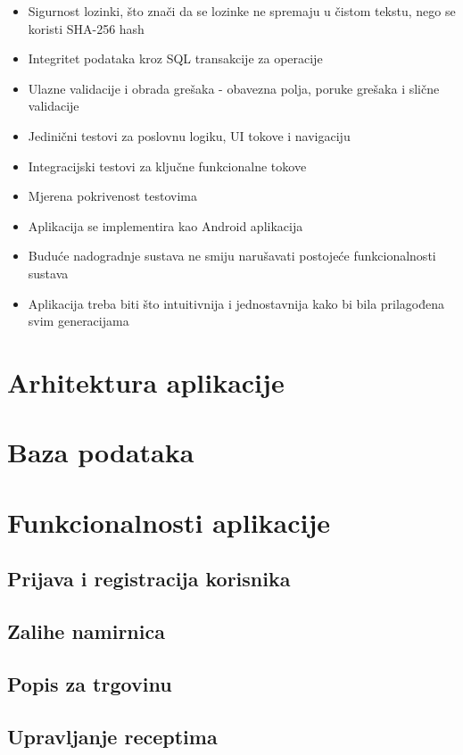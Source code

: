 \documentclass[diplomskirad]{fer}
\begin{document}
\begin{itemize}
    \item Sigurnost lozinki, što znači da se lozinke ne spremaju u čistom tekstu, nego se koristi SHA-256 hash
    \item Integritet podataka kroz SQL transakcije za operacije
    \item Ulazne validacije i obrada grešaka - obavezna polja, poruke grešaka i slične validacije
    \item Jedinični testovi za poslovnu logiku, UI tokove i navigaciju
    \item Integracijski testovi za ključne funkcionalne tokove
    \item Mjerena pokrivenost testovima
    \item Aplikacija se implementira kao Android aplikacija 
    \item Buduće nadogradnje sustava ne smiju narušavati postojeće funkcionalnosti sustava
    \item Aplikacija treba biti što intuitivnija i jednostavnija kako bi bila prilagođena svim generacijama
\end{itemize}

\section{Arhitektura aplikacije}

\section{Baza podataka}

\section{Funkcionalnosti aplikacije}
\subsection{Prijava i registracija korisnika}
\subsection{Zalihe namirnica}
\subsection{Popis za trgovinu}
\subsection{Upravljanje receptima}
\end{document}
